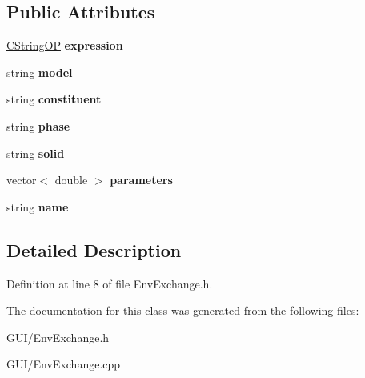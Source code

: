 \subsection*{Public Attributes}
\begin{DoxyCompactItemize}
\item 
\mbox{\label{class_c_env_exchange_aa9b1c16b5fb6d17376abaeb7707050e2}} 
\hyperlink{class_c_string_o_p}{C\+String\+OP} {\bfseries expression}
\item 
\mbox{\label{class_c_env_exchange_a38e2a8c5915e55b15ac061f186fd36d7}} 
string {\bfseries model}
\item 
\mbox{\label{class_c_env_exchange_a42cfc9f177421845681519a2e0378866}} 
string {\bfseries constituent}
\item 
\mbox{\label{class_c_env_exchange_ad1d9e440c5f320d329122bc06925bd23}} 
string {\bfseries phase}
\item 
\mbox{\label{class_c_env_exchange_a9d4bf06b87b4d83aba34536abf43e181}} 
string {\bfseries solid}
\item 
\mbox{\label{class_c_env_exchange_ab37f280acfbf2727eebe6b0dc29aad42}} 
vector$<$ double $>$ {\bfseries parameters}
\item 
\mbox{\label{class_c_env_exchange_a13740196a06e3c612167c375e7da08ba}} 
string {\bfseries name}
\end{DoxyCompactItemize}


\subsection{Detailed Description}


Definition at line 8 of file Env\+Exchange.\+h.



The documentation for this class was generated from the following files\+:\begin{DoxyCompactItemize}
\item 
G\+U\+I/Env\+Exchange.\+h\item 
G\+U\+I/Env\+Exchange.\+cpp\end{DoxyCompactItemize}
